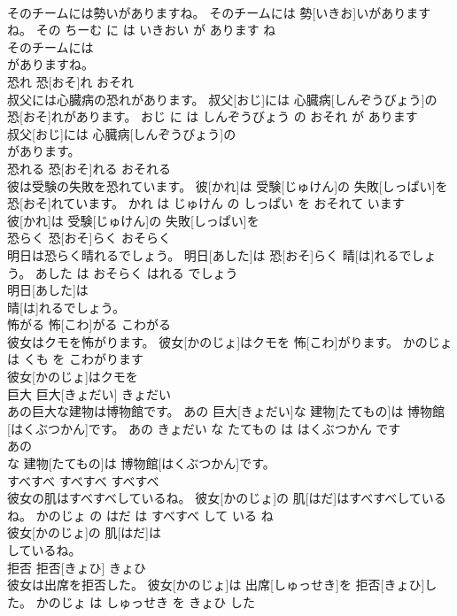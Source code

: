 \documentclass[8pt]{extreport}
\begin{document}
\begin{CJK}{UTF8}{min}
\\	そのチームには勢いがありますね。	そのチームには 勢[いきお]いがありますね。	その ちーむ に は いきおい が あります ね	
\\	そのチームには
\\	がありますね。			
\\	恐れ	恐[おそ]れ	おそれ	
\\	叔父には心臓病の恐れがあります。	叔父[おじ]には 心臓病[しんぞうびょう]の 恐[おそ]れがあります。	おじ に は しんぞうびょう の おそれ が あります	
\\	叔父[おじ]には 心臓病[しんぞうびょう]の
\\	があります。			
\\	恐れる	恐[おそ]れる	おそれる	
\\	彼は受験の失敗を恐れています。	彼[かれ]は 受験[じゅけん]の 失敗[しっぱい]を 恐[おそ]れています。	かれ は じゅけん の しっぱい を おそれて います	
\\	彼[かれ]は 受験[じゅけん]の 失敗[しっぱい]を
\\	恐らく	恐[おそ]らく	おそらく	
\\	明日は恐らく晴れるでしょう。	明日[あした]は 恐[おそ]らく 晴[は]れるでしょう。	あした は おそらく はれる でしょう	
\\	明日[あした]は
\\	晴[は]れるでしょう。			
\\	怖がる	怖[こわ]がる	こわがる	
\\	彼女はクモを怖がります。	彼女[かのじょ]はクモを 怖[こわ]がります。	かのじょ は くも を こわがります	
\\	彼女[かのじょ]はクモを
\\	巨大	巨大[きょだい]	きょだい	
\\	あの巨大な建物は博物館です。	あの 巨大[きょだい]な 建物[たてもの]は 博物館[はくぶつかん]です。	あの きょだい な たてもの は はくぶつかん です	
\\	あの
\\	な 建物[たてもの]は 博物館[はくぶつかん]です。			
\\	すべすべ	すべすべ	すべすべ	
\\	彼女の肌はすべすべしているね。	彼女[かのじょ]の 肌[はだ]はすべすべしているね。	かのじょ の はだ は すべすべ して いる ね	
\\	彼女[かのじょ]の 肌[はだ]は
\\	しているね。			
\\	拒否	拒否[きょひ]	きょひ	
\\	彼女は出席を拒否した。	彼女[かのじょ]は 出席[しゅっせき]を 拒否[きょひ]した。	かのじょ は しゅっせき を きょひ した	

\end{CJK}
\end{document}
